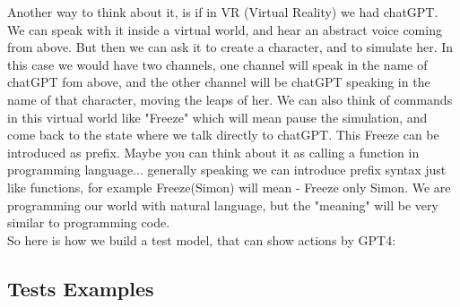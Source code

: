 \documentclass{article}
\begin{document}
Another way to think about it, is if in VR (Virtual Reality) we had chatGPT. We can speak with it inside a virtual world, and hear an abstract voice coming from above. But then we can ask it to create a character, and to simulate her. In this case we would have two channels, one channel will speak in the name of chatGPT fom above, and the other channel will be chatGPT speaking in the name of that character, moving the leaps of her. We can also think of commands in this virtual world like "Freeze" which will mean pause the simulation, and come back to the state where we talk directly to chatGPT. This Freeze can be introduced as prefix. Maybe you can think about it as calling a function in programming language... generally speaking we can introduce prefix syntax just like functions, for example Freeze(Simon) will mean - Freeze only Simon. We are programming our world with natural language, but the "meaning" will be very similar to programming code.\\

So here is how we build a test model, that can show actions by GPT4:

\subsection{Tests Examples}
\end{document}
